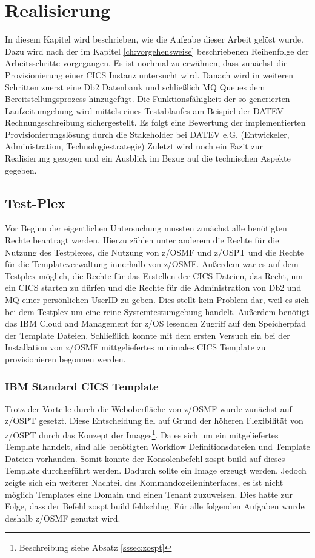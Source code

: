 \chapter{Realisierung}\label{ch:realisierung}
In diesem Kapitel wird beschrieben, wie die Aufgabe dieser Arbeit gelöst wurde.
Dazu wird nach der im Kapitel \ref{ch:vorgehensweise} beschriebenen Reihenfolge der Arbeitsschritte vorgegangen.
Es ist nochmal zu erwähnen, dass zunächst die Provisionierung einer CICS Instanz untersucht wird.
Danach wird in weiteren Schritten zuerst eine Db2 Datenbank und schließlich MQ Queues dem Bereitstellungsprozess hinzugefügt.
Die Funktionsfähigkeit der so generierten Laufzeitumgebung wird mittels eines Testablaufes am Beispiel der DATEV Rechnungsschreibung  sichergestellt. 
Es folgt eine Bewertung der implementierten Provisionierungslösung durch die Stakeholder bei DATEV e.G. (Entwickeler, Administration, Technologiestrategie)
Zuletzt wird noch ein Fazit zur Realisierung gezogen und ein Ausblick im Bezug auf die technischen Aspekte gegeben.

\section{Test-Plex}
Vor Beginn der eigentlichen Untersuchung mussten zunächst alle benötigten Rechte beantragt werden.
Hierzu zählen unter anderem die Rechte für die Nutzung des Testplexes, die Nutzung von z/OSMF und z/OSPT und die Rechte für die Templateverwaltung innerhalb von z/OSMF.
Außerdem war es auf dem Testplex möglich, die Rechte für das Erstellen der CICS Dateien, das Recht, um ein CICS starten zu dürfen und die Rechte für die Administration von Db2 und MQ einer persönlichen UserID zu geben.
Dies stellt kein Problem dar, weil es sich bei dem Testplex um eine reine Systemtestumgebung handelt.
Außerdem benötigt das IBM Cloud and Management for z/OS lesenden Zugriff auf den Speicherpfad der Template Dateien.
Schließlich konnte mit dem ersten Versuch ein bei der Installation von z/OSMF mittgeliefertes minimales CICS Template zu provisionieren begonnen werden.

\subsection{IBM Standard CICS Template}
Trotz der Vorteile durch die Weboberfläche von z/OSMF wurde zunächst auf z/OSPT gesetzt.
Diese Entscheidung fiel auf Grund der höheren Flexibilität von z/OSPT durch das Konzept der Images\footnote{Beschreibung siehe Absatz \ref{sssec:zospt}}.
Da es sich um ein mitgeliefertes Template handelt, sind alle benötigten Workflow Definitionsdateien und Template Dateien vorhanden.
Somit konnte der Konsolenbefehl \glqq zospt build\grqq{} auf dieses Template durchgeführt werden.
Dadurch sollte ein Image erzeugt werden.
Jedoch zeigte sich ein weiterer Nachteil des Kommandozeileninterfaces, es ist nicht möglich Templates eine Domain und einen Tenant zuzuweisen.
Dies hatte zur Folge, dass der Befehl \glqq zospt build\grqq{} fehlschlug.
Für alle folgenden Aufgaben wurde deshalb z/OSMF genutzt wird.

